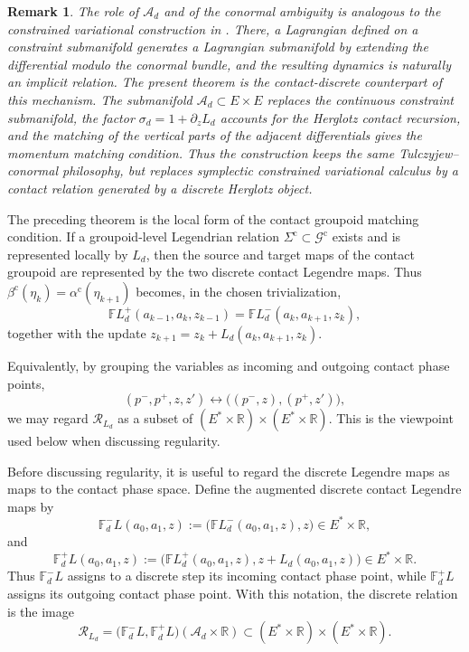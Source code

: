 \documentclass[11pt]{article}
\newtheorem{remark}[theorem]{Remark}
\newcommand{\R}{\mathbb{R}}
\newcommand{\mc}[1]{\mathcal{#1}}
\newcommand{\FL}{\mathbb{F}L}
\begin{document}
\begin{remark}
The role of \(\mc A_d\) and of the conormal ambiguity is analogous to the
constrained variational construction in \cite{deLeonJimenezMartinDeDiego2012}.
There, a Lagrangian defined on a constraint submanifold generates a Lagrangian
submanifold by extending the differential modulo the conormal bundle, and the
resulting dynamics is naturally an implicit relation. The present theorem is
the contact-discrete counterpart of this mechanism. The submanifold
\(\mc A_d\subset E\times E\) replaces the continuous constraint submanifold,
the factor \(\sigma_d=1+\partial_zL_d\) accounts for the Herglotz contact
recursion, and the matching of the vertical parts of the adjacent differentials
gives the momentum matching condition. Thus the construction keeps the same
Tulczyjew--conormal philosophy, but replaces symplectic constrained
variational calculus by a contact relation generated by a discrete Herglotz
object.
\end{remark}

The preceding theorem is the local form of the contact groupoid matching
condition. If a groupoid-level Legendrian relation
\(\Sigma^{\mathrm c}\subset\mathcal G^{\mathrm c}\) exists and is represented
locally by \(L_d\), then the source and target maps of the contact groupoid are
represented by the two discrete contact Legendre maps. Thus
\(\beta^{\mathrm c}(\eta_k)=\alpha^{\mathrm c}(\eta_{k+1})\) becomes, in the
chosen trivialization,
\[
\FL_d^+(a_{k-1},a_k,z_{k-1})
=
\FL_d^-(a_k,a_{k+1},z_k),
\]
together with the update \(z_{k+1}=z_k+L_d(a_k,a_{k+1},z_k)\).

Equivalently, by grouping the variables as incoming and outgoing contact phase
points,
\[
(p^-,p^+,z,z')
\longleftrightarrow
\bigl((p^-,z),(p^+,z')\bigr),
\]
we may regard \(\mc R_{L_d}\) as a subset of $(E^*\times\R)\times(E^*\times\R)$. This is the viewpoint used below when discussing regularity.

Before discussing regularity, it is useful to regard the discrete Legendre maps
as maps to the contact phase space. Define the augmented discrete contact
Legendre maps by
\[
\mathbb F_d^-L(a_0,a_1,z)
:=
\bigl(\FL_d^-(a_0,a_1,z),z\bigr)
\in E^*\times\R,
\]
and
\[
\mathbb F_d^+L(a_0,a_1,z)
:=
\bigl(\FL_d^+(a_0,a_1,z),z+L_d(a_0,a_1,z)\bigr)
\in E^*\times\R.
\]
Thus \(\mathbb F_d^-L\) assigns to a discrete step its incoming contact phase
point, while \(\mathbb F_d^+L\) assigns its outgoing contact phase point. With
this notation, the discrete relation is the image
\[
\mc R_{L_d}
=
\bigl(\mathbb F_d^-L,\mathbb F_d^+L\bigr)(\mc A_d\times\R)
\subset
(E^*\times\R)\times(E^*\times\R).
\]
\end{document}

